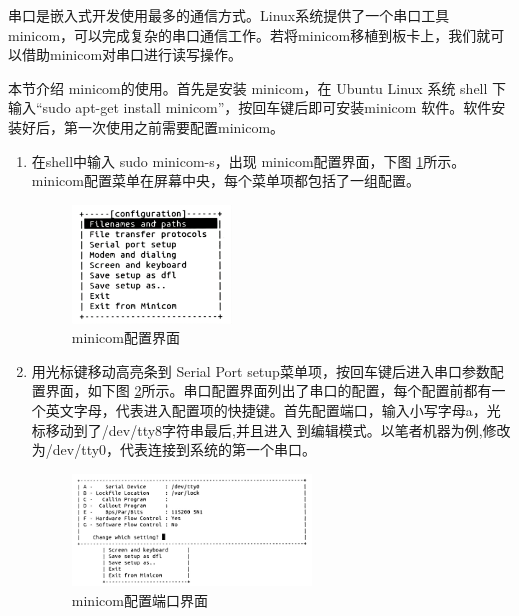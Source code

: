 串口是嵌入式开发使用最多的通信方式。Linux系统提供了一个串口工具minicom，可以完成复杂的串口通信工作。若将minicom移植到板卡上，我们就可以借助minicom对串口进行读写操作。


本节介绍 minicom的使用。首先是安装 minicom，在 Ubuntu Linux 系统 shell 下输入“sudo apt-get install minicom”，按回车键后即可安装minicom 软件。软件安装好后，第一次使用之前需要配置minicom。

\begin{enumerate}
	\item 在shell中输入 sudo minicom-s，出现 minicom配置界面，下图 \ref{minicom配置界面}所示。minicom配置菜单在屏幕中央，每个菜单项都包括了一组配置。
	\begin{figure}[h]
		\centering
		\includegraphics[width=0.4\textwidth]{figures/08-01-minicom配置界面.png}
		\caption{minicom配置界面}
		\label{minicom配置界面}
	\end{figure}

	\item 用光标键移动高亮条到 Serial Port setup菜单项，按回车键后进入串口参数配置界面，如下图 \ref{minicom配置端口界面}所示。串口配置界面列出了串口的配置，每个配置前都有一个英文字母，代表进入配置项的快捷键。首先配置端口，输入小写字母a，光标移动到了/dev/tty8字符串最后,并且进入
	到编辑模式。以笔者机器为例,修改为/dev/tty0，代表连接到系统的第一个串口。
	\begin{figure}[h]
		\centering
		\includegraphics[width=0.6\textwidth]{figures/08-01-minicom配置端口界面.png}
		\caption{minicom配置端口界面}
		\label{minicom配置端口界面}
	\end{figure}


\end{enumerate}
